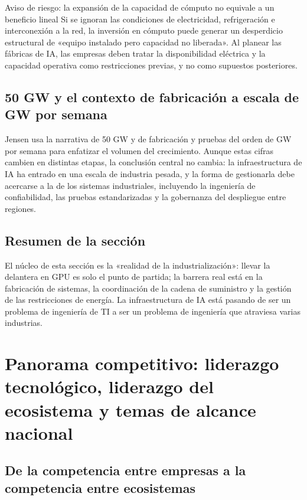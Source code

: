 \documentclass[a4paper]{article}
\begin{document}
\begin{warningbox}{Aviso de riesgo: la expansión de la capacidad de cómputo no equivale a un beneficio lineal}
Si se ignoran las condiciones de electricidad, refrigeración e interconexión a la red, la inversión en cómputo puede generar un desperdicio estructural de «equipo instalado pero capacidad no liberada». Al planear las fábricas de IA, las empresas deben tratar la disponibilidad eléctrica y la capacidad operativa como restricciones previas, y no como supuestos posteriores.
\end{warningbox}

\subsection{50 GW y el contexto de fabricación a escala de GW por semana}

Jensen usa la narrativa de 50 GW y de fabricación y pruebas del orden de GW por semana para enfatizar el volumen del crecimiento. Aunque estas cifras cambien en distintas etapas, la conclusión central no cambia: la infraestructura de IA ha entrado en una escala de industria pesada, y la forma de gestionarla debe acercarse a la de los sistemas industriales, incluyendo la ingeniería de confiabilidad, las pruebas estandarizadas y la gobernanza del despliegue entre regiones.

\subsection{Resumen de la sección}

El núcleo de esta sección es la «realidad de la industrialización»: llevar la delantera en GPU es solo el punto de partida; la barrera real está en la fabricación de sistemas, la coordinación de la cadena de suministro y la gestión de las restricciones de energía. La infraestructura de IA está pasando de ser un problema de ingeniería de TI a ser un problema de ingeniería que atraviesa varias industrias.

\section{Panorama competitivo: liderazgo tecnológico, liderazgo del ecosistema y temas de alcance nacional}

\subsection{De la competencia entre empresas a la competencia entre ecosistemas}
\end{document}
